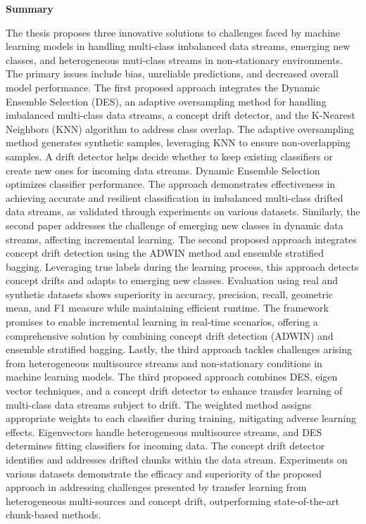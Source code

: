\begin{alwayssingle} \pagestyle{empty}\begin{center}
    \vspace*{1.5cm}
    {\Large \bfseries  Summary}
  \end{center}       %
The thesis proposes three innovative solutions to challenges faced by machine learning models in handling multi-class imbalanced data streams, emerging new classes, and heterogeneous muti-class streams in non-stationary environments. The primary issues include bias, unreliable predictions, and decreased overall model performance.
The first proposed approach integrates the Dynamic Ensemble Selection (DES), an adaptive oversampling method for handling imbalanced multi-class data streams, a concept drift detector, and the K-Nearest Neighbors (KNN) algorithm to address class overlap. The adaptive oversampling method generates synthetic samples, leveraging KNN to ensure non-overlapping samples. A drift detector helps decide whether to keep existing classifiers or create new ones for incoming data streams. Dynamic Ensemble Selection optimizes classifier performance. The approach demonstrates effectiveness in achieving accurate and resilient classification in imbalanced multi-class drifted data streams, as validated through experiments on various datasets.
Similarly, the second paper addresses the challenge of emerging new classes in dynamic data streams, affecting incremental learning. The second proposed approach integrates concept drift detection using the ADWIN method and ensemble stratified bagging. Leveraging true labels during the learning process, this approach detects concept drifts and adapts to emerging new classes. Evaluation using real and synthetic datasets shows superiority in accuracy, precision, recall, geometric mean, and F1 measure while maintaining efficient runtime. The framework promises to enable incremental learning in real-time scenarios, offering a comprehensive solution by combining concept drift detection (ADWIN) and ensemble stratified bagging.
Lastly, the third approach tackles challenges arising from heterogeneous multisource streams and non-stationary conditions in machine learning models. The third proposed approach combines DES, eigen vector techniques, and a concept drift detector to enhance transfer learning of multi-class data streams subject to drift. The weighted method assigns appropriate weights to each classifier during training, mitigating adverse learning effects. Eigenvectors handle heterogeneous multisource streams, and DES determines fitting classifiers for incoming data. The concept drift detector identifies and addresses drifted chunks within the data stream. Experiments on various datasets demonstrate the efficacy and superiority of the proposed approach in addressing challenges presented by transfer learning from heterogeneous multi-sources and concept drift, outperforming state-of-the-art chunk-based methods.

\end{alwayssingle}


